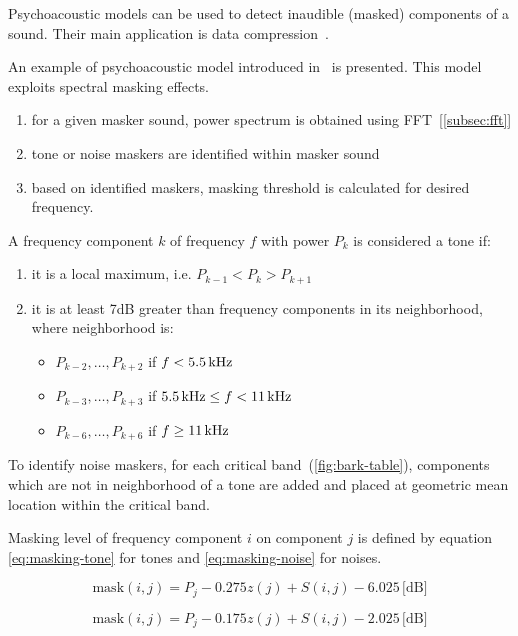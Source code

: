 \documentclass[english,bachelor,a4paper,oneside]{ppfcmthesis}
\begin{document}
Psychoacoustic models can be used to detect inaudible (masked) components of a sound. Their main application is data compression~\cite{MPEG}.

An example of psychoacoustic model introduced in~\cite{WAVS} is presented. This model exploits spectral masking effects.

\begin{enumerate}
\item for a given masker sound, power spectrum is obtained using FFT~[\ref{subsec:fft}]
\item tone or noise maskers are identified within masker sound
\item based on identified maskers, masking threshold is calculated for desired frequency.
\end{enumerate}

A frequency component $k$ of frequency $f$ with power $P_{k}$ is considered a tone if:
\begin{enumerate}
\item it is a local maximum, i.e. $P_{k-1} < P_{k} > P_{k+1}$
\item it is at least 7dB greater than frequency components in its neighborhood, where neighborhood is:
  \begin{itemize}
  \item $P_{k-2}, \ldots, P_{k+2}$ if $f < \textrm{5.5\,kHz}$
  \item $P_{k-3}, \ldots, P_{k+3}$ if $\textrm{5.5\,kHz} \leq f < \textrm{11\,kHz}$
  \item $P_{k-6}, \ldots, P_{k+6}$ if $f \geq \textrm{11\,kHz}$
  \end{itemize}
\end{enumerate}

To identify noise maskers, for each critical band~(\ref{fig:bark-table}), components which are not in neighborhood of a tone are added and placed at geometric mean location within the critical band.

Masking level of frequency component $i$ on component $j$ is defined by equation \ref{eq:masking-tone} for tones and \ref{eq:masking-noise} for noises.

\begin{equation}
\textrm{mask}(i, j) = P_{j} - 0.275 z(j) + S(i, j) - 6.025\,\textrm{[dB]}
\label{eq:masking-tone}
\end{equation}

\begin{equation}
\textrm{mask}(i, j) = P_{j} - 0.175 z(j) + S(i, j) - 2.025\,\textrm{[dB]}
\label{eq:masking-noise}
\end{equation}
\end{document}
